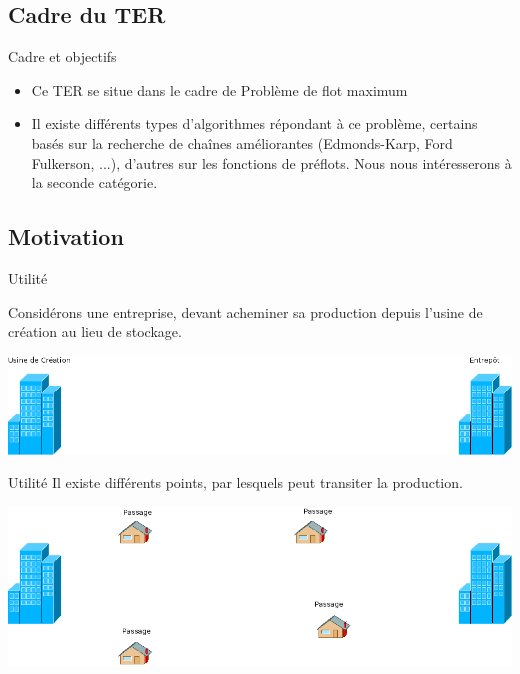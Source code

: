 \subsection{Cadre du TER}
\begin{frame}{Cadre et objectifs}
	\begin{itemize}
		\item Ce TER se situe dans le cadre de Problème de flot maximum

		\item Il existe différents types d'algorithmes répondant à ce problème, certains basés sur la recherche
			de chaînes améliorantes (Edmonds-Karp, Ford Fulkerson, ...), d'autres sur les fonctions de préflots. 
			Nous nous intéresserons à la seconde catégorie.
	\end{itemize}
\end{frame}

\subsection{Motivation}
\begin{frame}{Utilité}
	
	Considérons une entreprise, devant acheminer sa production depuis
	l'usine de création au lieu de stockage. \vfill

	\begin{center}
		\includegraphics[scale=0.32]{img/etape1.png}
	\end{center}
\end{frame}

\begin{frame}{Utilité}
	Il existe différents points, par lesquels peut transiter la production.

	\begin{center}
		\includegraphics[scale=0.32]{img/etape2.png}
	\end{center}
\end{frame}

